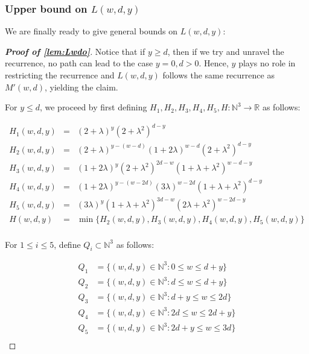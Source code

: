 \documentclass[10pt,a4paper]{article}
\newcommand{\N}{\mathbb{N}}
\newcommand{\R}{\mathbb{R}}
\newcommand{\openinteger}{y}
\begin{document}
\subsubsection{Upper bound on $L(w, d, \openinteger)$}

We are finally ready to give general bounds on $L(w, d, \openinteger)$:

\begin{proof}[\textbf{Proof of \cref{lem:Lwdo}}]

Notice that if $\openinteger \ge d$, then if we try and unravel the recurrence, no path can lead to the case $\openinteger = 0, d > 0$. Hence, $\openinteger$ plays no role in restricting the recurrence and $L(w, d, \openinteger)$ follows the same recurrence as $M'(w, d)$, yielding the claim.

For $\openinteger \le d$, we proceed by first defining $H_1, H_2, H_3, H_4, H_5, H: \N^3\rightarrow \R$ as follows:

\begin{eqnarray*}
H_1(w, d, \openinteger) & = & (2+\lambda)^{\openinteger}(2+\lambda^2)^{d-\openinteger}\\
H_2(w, d, \openinteger) & = & (2+\lambda)^{\openinteger - (w-d)}(1+2\lambda)^{w-d}(2+\lambda^2)^{d-\openinteger}\\
H_3(w, d, \openinteger) & = & (1+2\lambda)^{\openinteger}(2+\lambda^2)^{2d-w}(1+\lambda+\lambda^2)^{w-d-\openinteger}\\
H_4(w, d, \openinteger) & = & (1+2\lambda)^{\openinteger - (w-2d)}(3\lambda)^{w-2d}(1+\lambda+\lambda^2)^{d-\openinteger}\\
H_5(w, d, \openinteger) & = & (3\lambda)^{\openinteger}(1+\lambda+\lambda^2)^{3d-w}(2\lambda + \lambda^2)^{w-2d-\openinteger}\\
H(w, d, \openinteger) & = & \min\{H_2(w, d, \openinteger), H_3(w, d, \openinteger), H_4(w, d, \openinteger), H_5(w, d, \openinteger)\}\\
\end{eqnarray*}

For $1\le i\le 5$, define $Q_i\subset \N^3$ as follows:

\begin{align*}
Q_1 & = \{(w, d, \openinteger)\in \N^3: 0 \le w \le d + \openinteger\}\\
Q_2 & = \{(w, d, \openinteger)\in \N^3: d \le w \le d + \openinteger\}\\
Q_3 & = \{(w, d, \openinteger)\in \N^3: d + \openinteger \le w \le 2d\}\\
Q_4 & = \{(w, d, \openinteger)\in \N^3: 2d \le w \le 2d + \openinteger\}\\
Q_5 & = \{(w, d, \openinteger)\in \N^3: 2d + \openinteger \le w \le 3d\}\\
\end{align*}


\end{proof}
\end{document}
